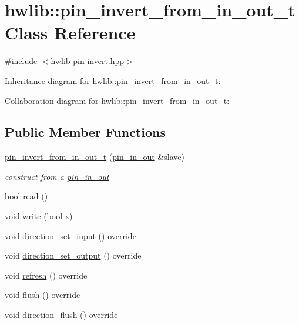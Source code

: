 \hypertarget{classhwlib_1_1pin__invert__from__in__out__t}{}\section{hwlib\+:\+:pin\+\_\+invert\+\_\+from\+\_\+in\+\_\+out\+\_\+t Class Reference}
\label{classhwlib_1_1pin__invert__from__in__out__t}


{\ttfamily \#include $<$hwlib-\/pin-\/invert.\+hpp$>$}



Inheritance diagram for hwlib\+:\+:pin\+\_\+invert\+\_\+from\+\_\+in\+\_\+out\+\_\+t\+:


Collaboration diagram for hwlib\+:\+:pin\+\_\+invert\+\_\+from\+\_\+in\+\_\+out\+\_\+t\+:
\subsection*{Public Member Functions}
\begin{DoxyCompactItemize}
\item 
\mbox{\label{classhwlib_1_1pin__invert__from__in__out__t_aa613f8a78253f7725988eaed91a5ef39}} 
\hyperlink{classhwlib_1_1pin__invert__from__in__out__t_aa613f8a78253f7725988eaed91a5ef39}{pin\+\_\+invert\+\_\+from\+\_\+in\+\_\+out\+\_\+t} (\hyperlink{classhwlib_1_1pin__in__out}{pin\+\_\+in\+\_\+out} \&slave)
\begin{DoxyCompactList}\small\item\em construct from a \hyperlink{classhwlib_1_1pin__in__out}{pin\+\_\+in\+\_\+out} \end{DoxyCompactList}\item 
bool \hyperlink{classhwlib_1_1pin__invert__from__in__out__t_a36432019f4ab69ea26255b70641599bd}{read} ()
\item 
void \hyperlink{classhwlib_1_1pin__invert__from__in__out__t_a6569f8c7c0b1591cc61d1b76736dec76}{write} (bool x)
\item 
void \hyperlink{classhwlib_1_1pin__invert__from__in__out__t_a2d332560ffbdac49b5807f43bb908b46}{direction\+\_\+set\+\_\+input} () override
\item 
void \hyperlink{classhwlib_1_1pin__invert__from__in__out__t_ae790759c546b1cd54c55b6aa3ec84600}{direction\+\_\+set\+\_\+output} () override
\item 
void \hyperlink{classhwlib_1_1pin__invert__from__in__out__t_a3cb25b54497d924b0b7206af9524d675}{refresh} () override
\item 
void \hyperlink{classhwlib_1_1pin__invert__from__in__out__t_ab8eefcc2f37559eb78935a72bcdd32ae}{flush} () override
\item 
void \hyperlink{classhwlib_1_1pin__invert__from__in__out__t_ac5480e6ca1a3e528e8f4e8ba3c946110}{direction\+\_\+flush} () override
\end{DoxyCompactItemize}


